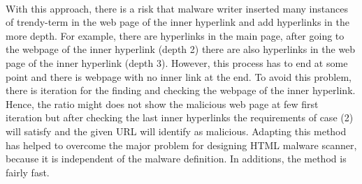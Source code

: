\paragraph{} 
With this approach, there is a risk that malware writer inserted many instances of trendy-term in the web page of the inner hyperlink and add hyperlinks in the more depth. For example, there are hyperlinks in the main page, after going to the webpage of the inner hyperlink (depth 2) there are also hyperlinks in the web page of the inner hyperlink (depth 3). However, this process has to end at some point and there is webpage with no inner link at the end. To avoid this problem, there is iteration for the finding and checking the webpage of the inner hyperlink. Hence, the ratio might does not show the malicious web page at few first iteration but after checking the last inner hyperlinks the requirements of case (2) will satisfy and the given URL will identify as malicious. Adapting this method has helped to overcome the major problem for designing HTML malware scanner, because it is independent of the malware definition. In additions, the method is fairly fast.  
